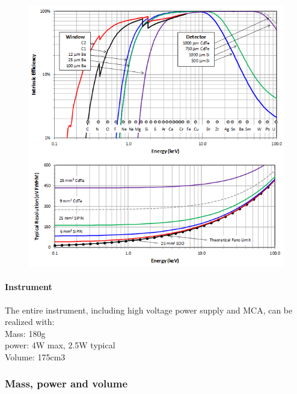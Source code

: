 \begin{figure}[h]
	\centering
	\includegraphics[width=\textwidth]{figures/XRF/EnergyRes.png}
	\caption{\cite{AmptekDetector}}
	\label{fig:AmptekDetector}
\end{figure}





\paragraph{Instrument}
The entire instrument, including high voltage power supply and MCA, can be realized with\citep{AmptekDetector}:\\
Mass: 180g\\
power: 4W max, 2.5W typical\\
Volume: 175cm3



\subsubsection{Mass, power and volume}




